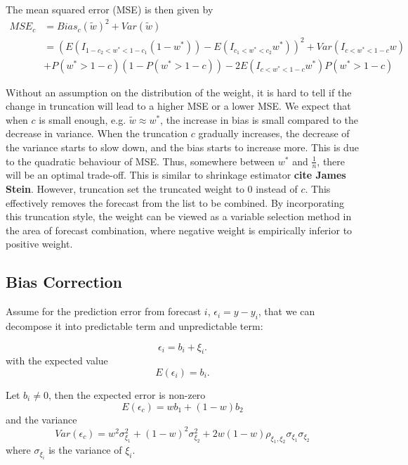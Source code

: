 \documentclass[11pt]{article}
\begin{document}
The mean squared error (MSE) is then given by 
\begin{equation}
\label{eqn: MSE trunc}
\begin{aligned}
MSE_c &= Bias_c(\tilde{w})^2 + Var(\tilde{w})\\
&=(E(I_{1-c_2<w^*<1-c_1}(1-w^*))-E(I_{c_1<w^*<c_2}w^*))^2 + Var(I_{c<w^*<1-c}w)\\ & + P(w^*>1-c)(1-P(w^*>1-c)) - 2E(I_{c<w^*<1-c}w^*)P(w^*>1-c)
\end{aligned}
\end{equation}

Without an assumption on the distribution of the weight, it is hard to tell if the change in truncation will lead to a higher MSE or a lower MSE. We expect that when $c$ is small enough, e.g. $\tilde{w}\approx w^*$, the increase in bias is small compared to the decrease in variance. When the truncation $c$ gradually increases, the decrease of the variance starts to slow down, and the bias starts to increase more. This is due to the quadratic behaviour of MSE. Thus, somewhere between $w^*$ and $\frac{1}{n}$, there will be an optimal trade-off. This is similar to shrinkage estimator \textbf{cite James Stein}. However, truncation set the truncated weight to 0 instead of $c$. This effectively removes the forecast from the list to be combined. By incorporating this truncation style, the weight can be viewed as a variable selection method in the area of forecast combination, where negative weight is empirically inferior to positive weight. 

\subsection{Bias Correction}\label{bias-correction}

Assume for the prediction error from forecast \(i\),
\(\epsilon_i = y - y_i\), that we can decompose it into predictable term
and unpredictable term:

\begin{equation}
\label{eqn: w bias assumption}
\epsilon_i = b_i + \xi_i. 
\end{equation}
with the expected value
\begin{equation}
\label{eqn: bias estimate}
E(\epsilon_i) = b_i.
\end{equation}

Let $b_i \neq 0$, then the expected error is non-zero
\begin{equation}
E(\epsilon_c) = wb_1+(1-w)b_2
\end{equation}
and the variance
\begin{equation}
Var(\epsilon_c) = w^2\sigma^2_{\xi_1} + (1-w)^2\sigma^2_{\xi_2} + 2w(1-w)\rho_{\xi_1,\xi_2}\sigma_{\xi_1}\sigma_{\xi_2}
\end{equation}
where $\sigma_{\xi_i}$ is the variance of $\xi_i$.
\end{document}
